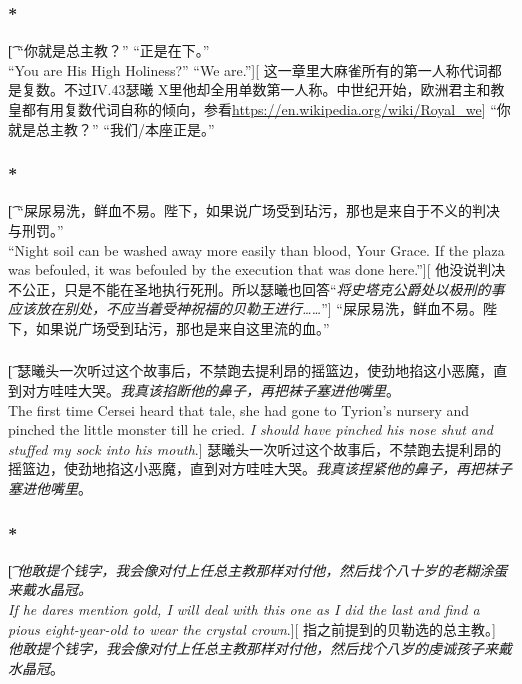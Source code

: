 \documentclass[12pt,a4paper]{article}
\begin{document}
\subsubsection{\color{red}*}\t[
	“你就是总主教？” “正是在下。”\\
	“You are His High Holiness?”  “We are.”][
	这一章里大麻雀所有的第一人称代词都是复数。不过IV.43瑟曦 X里他却全用单数第一人称。中世纪开始，欧洲君主和教皇都有用复数代词自称的倾向，参看\url{https://en.wikipedia.org/wiki/Royal_we}]
	“你就是总主教？” “我们/本座正是。”
	
\subsubsection{\color{red}*}\t[	
	“屎尿易洗，鲜血不易。陛下，如果说广场受到玷污，那也是来自于不义的判决与刑罚。”\\
	“Night soil can be washed away more easily than blood, Your Grace. If the plaza was befouled, it was befouled by the execution that was done here.”][
	他没说判决不公正，只是不能在圣地执行死刑。所以瑟曦也回答“\emph{将史塔克公爵处以极刑的事应该放在别处，不应当着受神祝福的贝勒王进行……}”]
	“屎尿易洗，鲜血不易。陛下，如果说广场受到玷污，那也是来自这里流的血。”
	
\subsubsection{}\t[
	瑟曦头一次听过这个故事后，不禁跑去提利昂的摇篮边，使劲地掐这小恶魔，直到对方哇哇大哭。\emph{我真该掐断他的鼻子，再把袜子塞进他嘴里}。\\
	The first time Cersei heard that tale, she had gone to Tyrion's nursery and pinched the little monster till he cried. \emph{I should have pinched his nose shut and stuffed my sock into his mouth}.]
	瑟曦头一次听过这个故事后，不禁跑去提利昂的摇篮边，使劲地掐这小恶魔，直到对方哇哇大哭。\emph{我真该捏紧他的鼻子，再把袜子塞进他嘴里}。
	
\subsubsection{\color{red}*}\t[
	\emph{他敢提个钱字，我会像对付上任总主教那样对付他，然后找个八十岁的老糊涂蛋来戴水晶冠。\\
	If he dares mention gold, I will deal with this one as I did the last and find a pious eight-year-old to wear the crystal crown}.][
	指之前提到的贝勒选的总主教。]
	\emph{他敢提个钱字，我会像对付上任总主教那样对付他，然后找个八岁的虔诚孩子来戴水晶冠}。
	
\end{document}
